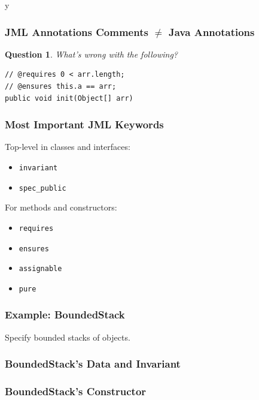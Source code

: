 \if y\MAKEHANDOUTS \documentclass[compress,landscape,handout]{beamer}
\newtheorem*{question}{Question}
\begin{document}
\begin{frame}[fragile]
\frametitle{JML Annotations Comments $\neq$ Java Annotations}
\begin{question}
What's wrong with the following?
\rm

\begin{lstlisting}
// @requires 0 < arr.length;
// @ensures this.a == arr;
public void init(Object[] arr)
\end{lstlisting}
\end{question}
\end{frame}

\begin{frame}
\frametitle{Most Important JML Keywords}

Top-level in classes and interfaces:
\begin{itemize}
\item
\lstinline!invariant!

\item
\lstinline!spec_public!
\end{itemize}

For methods and constructors:
\begin{itemize}
\item
\lstinline!requires!

\item
\lstinline!ensures!

\item
\lstinline!assignable!

\item
\lstinline!pure!
\end{itemize}
\end{frame}

\begin{frame}
\frametitle{Example: BoundedStack}

\begin{example}
Specify bounded stacks of objects.
\end{example}

\end{frame}

\begin{frame}[fragile]
\frametitle{BoundedStack's Data and Invariant}

\end{frame}

\begin{frame}[fragile]
\frametitle{BoundedStack's Constructor}

\end{frame}
\end{document}
